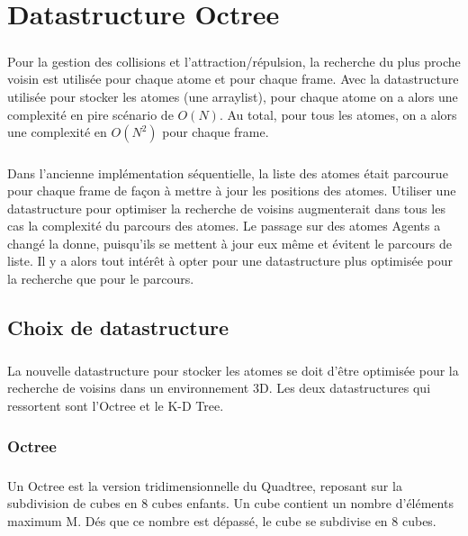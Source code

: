 \chapter{Datastructure Octree}
\label{mise_en_oeuvre}

\paragraph{}
Pour la gestion des collisions et l'attraction/répulsion, la recherche du plus
proche voisin est utilisée pour chaque atome et pour chaque frame. Avec la
datastructure utilisée pour stocker les atomes (une arraylist), pour chaque
atome on a alors une complexité en pire scénario de $O(N)$. Au total, pour tous
les atomes, on a alors une complexité en $O(N^2)$ pour chaque frame.

\paragraph{}
Dans l'ancienne implémentation séquentielle, la liste des atomes était
parcourue pour chaque frame de façon à mettre à jour les positions des atomes.
Utiliser une datastructure pour optimiser la recherche de voisins augmenterait
dans tous les cas la complexité du parcours des atomes. Le passage sur des
atomes Agents a changé la donne, puisqu'ils se mettent à jour eux même et
évitent le parcours de liste. Il y a alors tout intérêt à opter pour une
datastructure plus optimisée pour la recherche que pour le parcours.


\section{Choix de datastructure}

\paragraph{}
La nouvelle datastructure pour stocker les atomes se doit d'être optimisée pour
la recherche de voisins dans un environnement 3D. Les deux datastructures qui
ressortent sont l'Octree et le K-D Tree.

\subsection{Octree}

\paragraph{}
Un Octree est la version tridimensionnelle du Quadtree, reposant sur la
subdivision de cubes en 8 cubes enfants. Un cube contient un nombre d'éléments
maximum M. Dés que ce nombre est dépassé, le cube se subdivise en 8 cubes.

